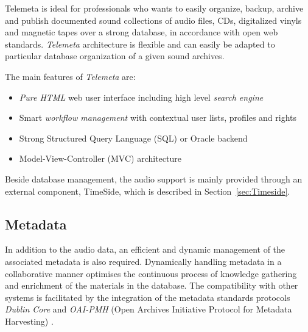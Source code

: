 \documentclass{aes53i}
\begin{document}

Telemeta is ideal for professionals who wants to easily organize, backup, archive and publish documented sound collections of audio files, CDs, digitalized vinyls and magnetic tapes over a strong database, in accordance with open web standards. 
\emph{Telemeta} architecture is flexible and can easily be adapted to particular database organization of a given sound archives. 

The main features of \emph{Telemeta} are:
\begin{itemize}
\item \emph{Pure HTML} web user interface including high level \emph{search engine}
\item Smart \emph{workflow management} with contextual user lists, profiles and rights
\item Strong Structured Query Language (SQL) or Oracle backend
\item Model-View-Controller (MVC) architecture 
\end{itemize}
Beside database management, the audio support is mainly provided through an external component, TimeSide, which is described in Section~\ref{sec:Timeside}.

\subsection{Metadata}\label{sec:metadata}
In addition to the audio data, an efficient and dynamic management of the associated metadata is also required. %
Dynamically handling metadata in a collaborative manner optimises the continuous process of knowledge gathering and enrichment of the materials in the database.  
The compatibility with other systems is facilitated by the integration of the metadata standards protocols \emph{Dublin Core} and \emph{OAI-PMH} (Open Archives Initiative Protocol for Metadata Harvesting) \cite{DublinCore,OAI-PMH}.
\end{document}
